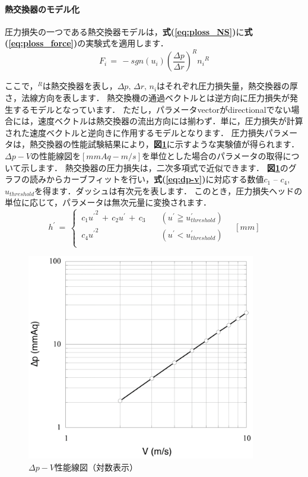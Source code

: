 %
\paragraph{熱交換器のモデル化}

圧力損失の一つである熱交換器モデルは，\textbf{式(\ref{eq:ploss_NS})}に\textbf{式(\ref{eq:ploss_force})}の実験式を適用します．
\begin{equation}
{F}_{i}
\,{=}\,
-sgn \left( u_{i} \right) {\left( \frac{\Delta p}{\Delta r} \right)}^{R} {n_{i}}^{R}
\label{eq:ploss_force}
\end{equation}

\noindent ここで，${}^{R}$は熱交換器を表し，$\Delta p,\,\Delta r,\,n_{i}$はそれぞれ圧力損失量，熱交換器の厚さ，法線方向を表します．
熱交換機の通過ベクトルとは逆方向に圧力損失が発生するモデルとなっています．
ただし，パラメータvectorがdirectionalでない場合には，速度ベクトルは熱交換器の流出方向には揃わず．単に，圧力損失が計算された速度ベクトルと逆向きに作用するモデルとなります．
圧力損失パラメータは，熱交換器の性能試験結果により，\textbf{図\ref{fig:ploss}}に示すような実験値が得られます．
$\Delta p-V$の性能線図を$[mmAq - m/s]$を単位とした場合のパラメータの取得について示します．
熱交換器の圧力損失は，二次多項式で近似できます．
\textbf{図\ref{fig:ploss}}のグラフの読みからカーブフィットを行い，\textbf{式(\ref{eq:dp-v})}に対応する数値$c_{1}$ -- $c_{4}$, $u_{threshold}$を得ます．ダッシュは有次元を表します．
このとき，圧力損失ヘッドの単位に応じて，パラメータは無次元量に変換されます．
\begin{equation}
{h}^{\prime}
\,{=}\,
\begin{cases}
\, c_{1} {u^{\prime}}^{2}\,+\,c_{2}u^{\prime}\,+\,c_{3} & \quad (u^{\prime} \geqq u^{\prime}_{threshold})\\
\, c_{4} {u^{\prime}}^{2} & \quad (u^{\prime}<u^{\prime}_{threshold})\\
\end{cases} \quad [mm]
\label{eq:dp-v}
\end{equation}

\begin{figure}[htdp]
\begin{center}
\includegraphics[width=10cm,clip]{ploss.eps}
\end{center}
\caption{$\Delta p-V$性能線図（対数表示）}
\label{fig:ploss}
\end{figure}

